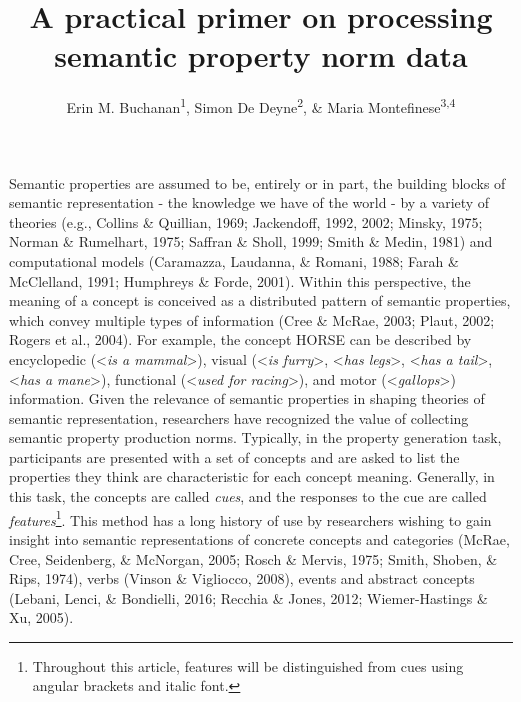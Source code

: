 \documentclass[man]{apa6}
\title{A practical primer on processing semantic property norm data}
\author{Erin M. Buchanan\textsuperscript{1}, Simon De Deyne\textsuperscript{2}, \& Maria Montefinese\textsuperscript{3,4}}
\date{}
\affiliation{
\vspace{0.5cm}
\textsuperscript{1} Harrisburg University of Science and Technology\\\textsuperscript{2} The University of Melbourne\\\textsuperscript{3} University of Padova\\\textsuperscript{4} University College London}
\let\rmarkdownfootnote\footnote%
\def\footnote{\protect\rmarkdownfootnote}
\begin{document}
\maketitle

Semantic properties are assumed to be, entirely or in part, the building blocks of semantic representation - the knowledge we have of the world - by a variety of theories (e.g., Collins \& Quillian, 1969; Jackendoff, 1992, 2002; Minsky, 1975; Norman \& Rumelhart, 1975; Saffran \& Sholl, 1999; Smith \& Medin, 1981) and computational models (Caramazza, Laudanna, \& Romani, 1988; Farah \& McClelland, 1991; Humphreys \& Forde, 2001). Within this perspective, the meaning of a concept is conceived as a distributed pattern of semantic properties, which convey multiple types of information (Cree \& McRae, 2003; Plaut, 2002; Rogers et al., 2004). For example, the concept HORSE can be described by encyclopedic (\textless{}\emph{is a mammal}\textgreater{}), visual (\textless{}\emph{is furry}\textgreater{}, \textless{}\emph{has legs}\textgreater{}, \textless{}\emph{has a tail}\textgreater{}, \textless{}\emph{has a mane}\textgreater{}), functional (\textless{}\emph{used for racing}\textgreater{}), and motor (\textless{}\emph{gallops}\textgreater{}) information. Given the relevance of semantic properties in shaping theories of semantic representation, researchers have recognized the value of collecting semantic property production norms. Typically, in the property generation task, participants are presented with a set of concepts and are asked to list the properties they think are characteristic for each concept meaning. Generally, in this task, the concepts are called \emph{cues}, and the responses to the cue are called \emph{features}\footnote{Throughout this article, features will be distinguished from cues using angular brackets and italic font.}. This method has a long history of use by researchers wishing to gain insight into semantic representations of concrete concepts and categories (McRae, Cree, Seidenberg, \& McNorgan, 2005; Rosch \& Mervis, 1975; Smith, Shoben, \& Rips, 1974), verbs (Vinson \& Vigliocco, 2008), events and abstract concepts (Lebani, Lenci, \& Bondielli, 2016; Recchia \& Jones, 2012; Wiemer-Hastings \& Xu, 2005).
\end{document}
